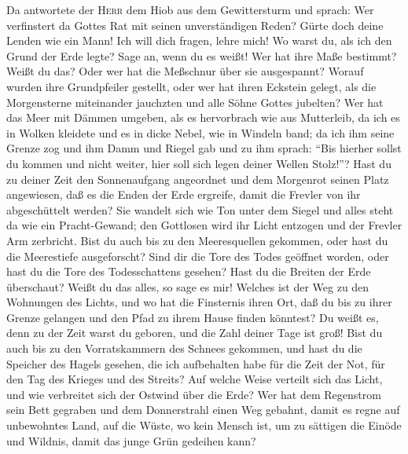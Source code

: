  Da antwortete der \textsc{Herr} dem Hiob aus dem
Gewittersturm und sprach:  Wer verfinstert da Gottes Rat
mit seinen unverständigen Reden?  Gürte doch deine Lenden
wie ein Mann! Ich will dich fragen, lehre mich!  Wo warst
du, als ich den Grund der Erde legte? Sage an, wenn du es weißt!
 Wer hat ihre Maße bestimmt? Weißt du das? Oder wer hat
die Meßschnur über sie ausgespannt?  Worauf wurden ihre
Grundpfeiler gestellt, oder wer hat ihren Eckstein gelegt,
 als die Morgensterne miteinander jauchzten und alle Söhne
Gottes jubelten?  Wer hat das Meer mit Dämmen umgeben, als
es hervorbrach wie aus Mutterleib,  da ich es in Wolken
kleidete und es in dicke Nebel, wie in Windeln band;  da
ich ihm seine Grenze zog und ihm Damm und Riegel gab und zu ihm sprach:
 ``Bis hierher sollst du kommen und nicht weiter, hier
soll sich legen deiner Wellen Stolz!''?  Hast du zu
deiner Zeit den Sonnenaufgang angeordnet und dem Morgenrot seinen Platz
angewiesen,  daß es die Enden der Erde ergreife, damit
die Frevler von ihr abgeschüttelt werden?  Sie wandelt
sich wie Ton unter dem Siegel und alles steht da wie ein Pracht-Gewand;
 den Gottlosen wird ihr Licht entzogen und der Frevler
Arm zerbricht.  Bist du auch bis zu den Meeresquellen
gekommen, oder hast du die Meerestiefe ausgeforscht? 
Sind dir die Tore des Todes geöffnet worden, oder hast du die Tore des
Todesschattens gesehen?  Hast du die Breiten der Erde
überschaut? Weißt du das alles, so sage es mir!  Welches
ist der Weg zu den Wohnungen des Lichts, und wo hat die Finsternis ihren
Ort,  daß du bis zu ihrer Grenze gelangen und den Pfad zu
ihrem Hause finden könntest?  Du weißt es, denn zu der
Zeit warst du geboren, und die Zahl deiner Tage ist groß!
 Bist du auch bis zu den Vorratskammern des Schnees
gekommen, und hast du die Speicher des Hagels gesehen, 
die ich aufbehalten habe für die Zeit der Not, für den Tag des Krieges
und des Streits?  Auf welche Weise verteilt sich das
Licht, und wie verbreitet sich der Ostwind über die Erde?
 Wer hat dem Regenstrom sein Bett gegraben und dem
Donnerstrahl einen Weg gebahnt,  damit es regne auf
unbewohntes Land, auf die Wüste, wo kein Mensch ist,  um
zu sättigen die Einöde und Wildnis, damit das junge Grün gedeihen kann?
